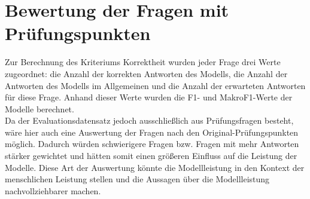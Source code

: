 \section{Bewertung der Fragen mit Prüfungspunkten}
Zur Berechnung des Kriteriums Korrektheit wurden jeder Frage drei Werte zugeordnet: die Anzahl der korrekten Antworten des Modells, die Anzahl der Antworten des Modells im Allgemeinen und die Anzahl der erwarteten Antworten für diese Frage.
Anhand dieser Werte wurden die F1- und MakroF1-Werte der Modelle berechnet.\\

Da der Evaluationsdatensatz jedoch ausschließlich aus Prüfungsfragen besteht, wäre hier auch eine Auswertung der Fragen nach den Original-Prüfungspunkten möglich.
Dadurch würden schwierigere Fragen bzw. Fragen mit mehr Antworten stärker gewichtet und hätten somit einen größeren Einfluss auf die Leistung der Modelle.
Diese Art der Auswertung könnte die Modellleistung in den Kontext der menschlichen Leistung stellen und die Aussagen über die Modellleistung nachvollziehbarer machen.
